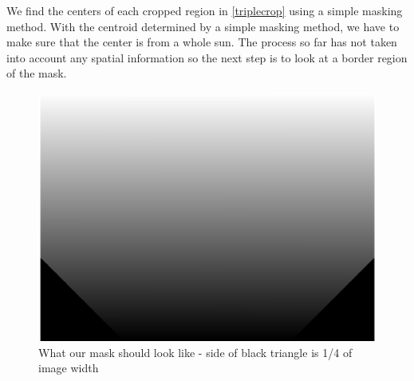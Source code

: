 \documentclass[10pt]{scrartcl}
\begin{document}
	We find the centers of each cropped region in \cref{triplecrop} using a simple masking method. With the centroid determined by a simple masking method, we have to make sure that the center is from a whole sun. The process so far has not taken into account any spatial information so the next step is to look at a border region of the mask. 





\begin{figure}[!ht]
    \centering
    \includegraphics[width=.9\textwidth]{../plots_tables_images/cutcorner.eps}    
    \caption{What our mask should look like - side of black triangle is 1/4 of image width}
    \label{dogeared}
\end{figure}
\end{document}
